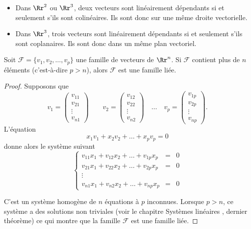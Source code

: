\documentclass[class=report,crop=false]{standalone}
\begin{document}
\begin{itemize}
\item Dans $\Rr^2$ ou $\Rr^3$, deux vecteurs sont linéairement dépendants si et seulement s'ils sont colinéaires.
Ils sont donc sur une même droite vectorielle.
\item Dans $\Rr^3$, trois vecteurs sont linéairement dépendants si et seulement s'ils sont coplanaires.
Ils sont donc dans un même plan vectoriel.
\end{itemize}
\pause
{}

\begin{proposition}
  Soit $\mathcal{F}=\{ v_1, v_2,\ldots ,v_p\}$ une famille de vecteurs de $\Rr^n$. Si
  $\mathcal{F}$ contient plus de $n$ éléments (c'est-à-dire $p > n$), alors
  $\mathcal{F}$ est une famille liée.
\end{proposition}

\begin{proof}
  Supposons que
  \[v_1=\begin{pmatrix}v_{11} \\ v_{21}\\\vdots\\ v_{n1}\end{pmatrix}\qquad
  v_2=\begin{pmatrix}v_{12}\\ v_{22}\\\vdots\\ v_{n2}\end{pmatrix}\quad\dots\quad
  v_p=\begin{pmatrix}v_{1p}\\ v_{2p}\\\vdots\\ v_{np}\end{pmatrix}.\]
  L'équation $$ x_1v_1 + x_2 v_2 + \dots + x_p v_p = 0 $$
  donne alors le système suivant
$$
\left\{\begin{array}{ccl}
v_{11} x_1 + v_{12} x_2 + \dots + v_{1p} x_p & = & 0\\
v_{21} x_1 + v_{22} x_2 + \dots + v_{2p} x_p & = & 0\\
\vdots  &&\\
v_{n1} x_1 + v_{n2} x_2 + \dots + v_{np} x_p & = & 0
\end{array}\right.
$$

C'est un système homogène de $n$ équations à $p$ inconnues.
Lorsque $p > n$, ce système a des solutions non triviales
(voir le chapitre \og Systèmes linéaires \fg{}, dernier théorème)
ce qui montre que la famille $\mathcal{F}$ est une famille liée.
\end{proof}
\end{document}
